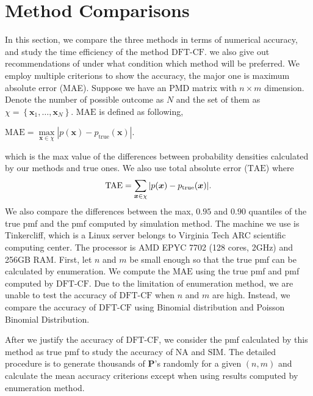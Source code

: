 \documentclass[12pt]{article}
\newcommand{\Pmat}{\mathbf{P}}
\newcommand{\TAE}{{\textrm{TAE}}}
\newcommand{\MAE}{{\textrm{MAE}}}
\newcommand{\xvec}{\boldsymbol{x}}
\newcommand{\SIM}{{\textrm{SIM}}}
\newcommand{\NA}{{\textrm{NA}}}
\newcommand{\dft}{{\textrm{DFT-CF}}}
\begin{document}
\section{Method Comparisons}\label{sec:Method Comparisons}
In this section, we compare the three methods in terms of numerical accuracy, and study the time efficiency of the method $\dft$. we also give out recommendations of under what condition which method will be preferred. We employ multiple criterions to show the accuracy, the major one is maximum absolute error (MAE). Suppose we have an PMD matrix with $n\times m$ dimension. Denote the number of possible outcome as $N$ and the set of them as $\chi = \left\{\xvec_1,\dots, \xvec_{N}\right\}$. $\MAE$ is defined as following,
\begin{center}
$\mathrm{\MAE} = \underset{\xvec \in \chi}{\max}|p(\xvec) - p_{\text{true}}(\xvec)|$.
\end{center}
which is the max value of the differences between probability densities calculated by our methods and true ones.
We also use total absolute error ($\TAE$)  where
\begin{equation*}
    \mbox{\TAE} = \sum_{\xvec \in \chi} |p(\xvec) - p_{\text{true}}(\xvec)|.
\end{equation*}
We also compare the differences between the max, $0.95$ and $0.90$ quantiles of the true pmf and the pmf computed by simulation method. The machine we use is Tinkercliff, which is a Linux server belongs to Virginia Tech ARC scientific computing center. The processor is AMD EPYC 7702 (128 cores, 2GHz) and 256GB RAM. First, let $n$ and $m$ be small enough so that the true pmf can be calculated by enumeration. We compute the $\MAE$ using the true pmf and pmf computed by $\dft$. Due to the limitation of enumeration method, we are unable to test the accuracy of $\dft$ when $n$ and $m$ are high. Instead, we compare the accuracy of $\dft$ using Binomial distribution and Poisson Binomial Distribution.

After we justify the accuracy of $\dft$, we consider the pmf calculated by this method as true pmf to study the accuracy of $\NA$ and $\SIM$. The detailed procedure is to generate thousands of $\Pmat$'s randomly for a given $(n, m)$ and calculate the mean accuracy criterions except when using results computed by enumeration method.






\end{document}
